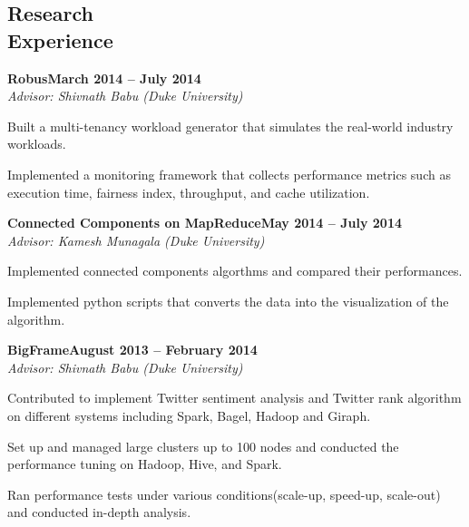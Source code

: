 \documentclass[11pt,margin,line]{cv}
\begin{document}
\begin{resume}
    \section{\mysidestyle Research\\Experience}
    \textbf{Robus}\hfill \textbf{March 2014 -- July 2014} \vspace{1mm}\\\vspace{0mm}%
    \textsl{Advisor: Shivnath Babu (Duke University)}
    \vspace{-2mm}\\\vspace{-1mm}%
    \begin{list3}
        \item Built a multi-tenancy workload generator that simulates the real-world industry workloads.
        \item Implemented a monitoring framework that collects performance metrics such as execution time, fairness index, throughput, and cache utilization.
    \end{list3}
    \textbf{Connected Components on MapReduce}\hfill \textbf{May 2014 -- July 2014} \vspace{1mm}\\\vspace{0mm}%
    \textsl{Advisor: Kamesh Munagala (Duke University)}
    \vspace{-2mm}\\\vspace{-1mm}%
    \begin{list3}
        \item Implemented connected components algorthms and compared their performances.
        \item Implemented python scripts that converts the data into the visualization of the algorithm.
    \end{list3}
    \textbf{BigFrame}\hfill \textbf{August 2013 -- February 2014} \vspace{1mm}\\\vspace{0mm}%
    \textsl{Advisor: Shivnath Babu (Duke University)}
    \vspace{-2mm}\\\vspace{-1mm}%
    \begin{list3}
      \item Contributed to implement Twitter sentiment analysis and Twitter rank algorithm on different systems including Spark, Bagel, Hadoop and Giraph.
      \item Set up and managed large clusters up to 100 nodes and conducted the performance tuning on Hadoop, Hive, and Spark.
      \item Ran performance tests under various conditions(scale-up, speed-up, scale-out) and conducted in-depth analysis.
    \end{list3}

\end{resume}
\end{document}
